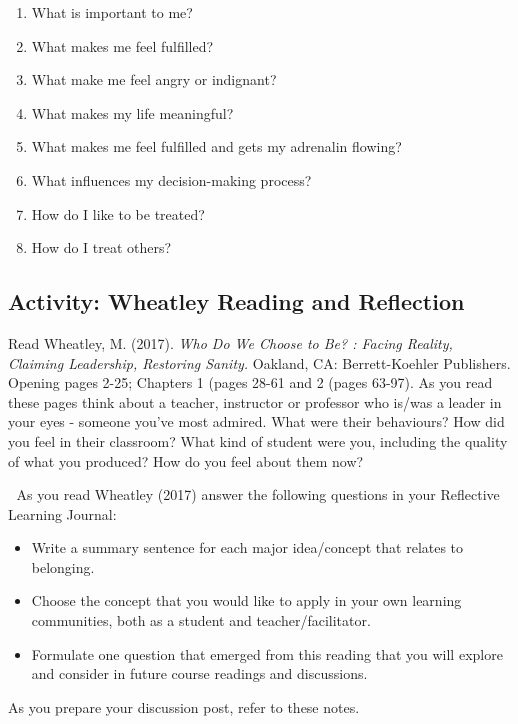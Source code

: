 \documentclass[
]{book}
\providecommand{\tightlist}{%
  \setlength{\itemsep}{0pt}\setlength{\parskip}{0pt}}
\begin{document}
\begin{enumerate}
\def\labelenumi{\arabic{enumi}.}
\tightlist
\item
  What is important to me?
\item
  What makes me feel fulfilled?
\item
  What make me feel angry or indignant?
\item
  What makes my life meaningful?
\item
  What makes me feel fulfilled and gets my adrenalin flowing?
\item
  What influences my decision-making process?
\item
  How do I like to be treated?
\item
  How do I treat others?
\end{enumerate}

\hypertarget{activity-wheatley-reading-and-reflection}{%
\subsection{Activity: Wheatley Reading and Reflection}\label{activity-wheatley-reading-and-reflection}}

\begin{reflect}
Read Wheatley, M. (2017). \emph{Who Do We Choose to Be? : Facing
Reality, Claiming Leadership, Restoring Sanity.} Oakland, CA:
Berrett-Koehler Publishers. Opening pages 2-25; Chapters 1 (pages 28-61
and 2 (pages 63-97). As you read these pages think about a teacher,
instructor or professor who is/was a leader in your eyes - someone
you've most admired. What were their behaviours? How did you feel in
their classroom? What kind of student were you, including the quality of
what you produced? How do you feel about them now?

💭 As you read Wheatley (2017) answer the following questions in your
Reflective Learning Journal:

\begin{itemize}
\tightlist
\item
  Write a summary sentence for each major idea/concept that relates to
  belonging.
\item
  Choose the concept that you would like to apply in your own learning
  communities, both as a student and teacher/facilitator.
\item
  Formulate one question that emerged from this reading that you will
  explore and consider in future course readings and discussions.
\end{itemize}

As you prepare your discussion post, refer to these notes.
\end{reflect}
\end{document}
